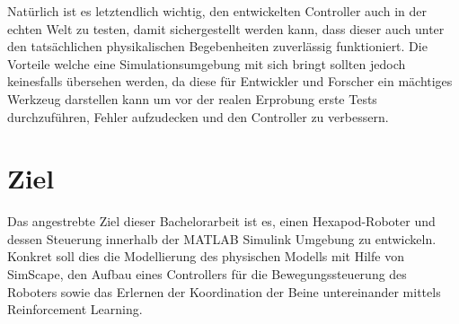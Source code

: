 Natürlich ist es letztendlich wichtig, den entwickelten Controller auch in der echten Welt zu testen, damit sichergestellt werden kann, dass dieser auch unter den tatsächlichen physikalischen Begebenheiten zuverlässig funktioniert.
Die Vorteile welche eine Simulationsumgebung mit sich bringt sollten jedoch keinesfalls übersehen werden, da diese für Entwickler und Forscher ein mächtiges Werkzeug darstellen kann um vor der realen Erprobung erste Tests durchzuführen, Fehler aufzudecken und den Controller zu verbessern.



\section{Ziel}
Das angestrebte Ziel dieser Bachelorarbeit ist es, einen Hexapod-Roboter und dessen Steuerung innerhalb der MATLAB Simulink Umgebung zu entwickeln.
Konkret soll dies die Modellierung des physischen Modells mit Hilfe von SimScape, den Aufbau eines Controllers für die Bewegungssteuerung des Roboters sowie das Erlernen der Koordination der Beine untereinander mittels Reinforcement Learning.

